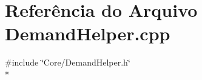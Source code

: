 \section{Referência do Arquivo Demand\+Helper.\+cpp}
\label{_demand_helper_8cpp}
{\ttfamily \#include \char`\"{}Core/\+Demand\+Helper.\+h\char`\"{}}\\*
